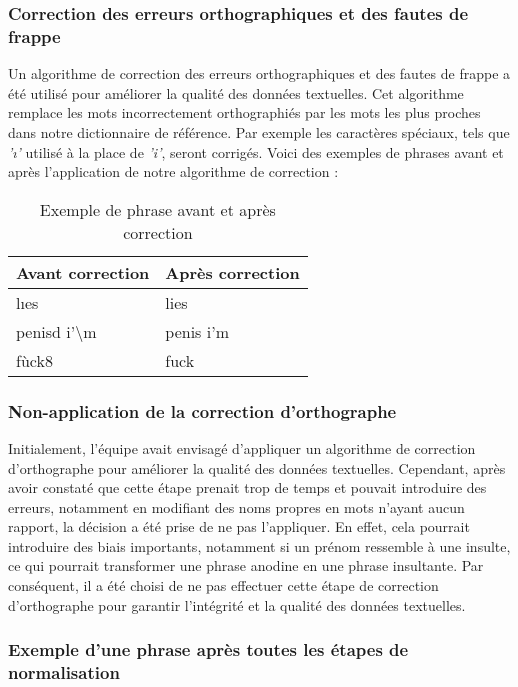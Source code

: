 \subsubsection*{Correction des erreurs orthographiques et des fautes de frappe}

Un algorithme de correction des erreurs orthographiques et des fautes de frappe a été utilisé pour améliorer la qualité des données textuelles. Cet algorithme remplace les mots incorrectement orthographiés par les mots les plus proches dans notre dictionnaire de référence. Par exemple les caractères spéciaux, tels que \textit{'ı'} utilisé à la place de \textit{'i'}, seront corrigés. Voici des exemples de phrases avant et après l'application de notre algorithme de correction :

\begin{table}[h]
    \centering
    \begin{tabular}{|l|l|}
    \hline
    \textbf{Avant correction} & \textbf{Après correction} \\ \hline
    lıes  & lies \\ \hline
    penisd i'\textbackslash m & penis i'm  \\ \hline
    fùck8 & fuck  \\ \hline
    \end{tabular}
    \caption{Exemple de phrase avant et après correction}
\end{table}

\subsubsection*{Non-application de la correction d'orthographe}
Initialement, l'équipe avait envisagé d'appliquer un algorithme de correction d'orthographe pour améliorer la qualité des données textuelles. Cependant, après avoir constaté que cette étape prenait trop de temps et pouvait introduire des erreurs, notamment en modifiant des noms propres en mots n'ayant aucun rapport, la décision a été prise de ne pas l'appliquer. En effet, cela pourrait introduire des biais importants, notamment si un prénom ressemble à une insulte, ce qui pourrait transformer une phrase anodine en une phrase insultante. Par conséquent, il a été choisi de ne pas effectuer cette étape de correction d'orthographe pour garantir l'intégrité et la qualité des données textuelles.

\subsubsection*{Exemple d'une phrase après toutes les étapes de normalisation}

